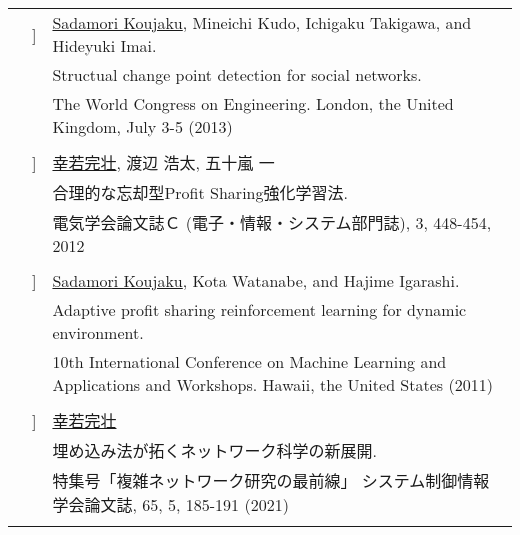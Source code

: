 \documentclass[letterpaper, 11pt]{article}
\newcounter{papercount}
\newcounter{papertype}
\newcommand{\changepapertype}{\setcounter{papercount}{0}\stepcounter{papertype}}
\newcommand{\paperitem}{%
\stepcounter{papercount}%
{\color{OliveGreen}{[\Alph{papertype}\thepapercount}]}
}
\begin{document}
\begin{longtable}{p{1.3in}p{2em}p{5.5in}}
                                                    &\paperitem &  \underline{Sadamori Koujaku}, Mineichi Kudo, Ichigaku Takigawa, and Hideyuki Imai. \\
                                                    & & Structual change point detection for social networks. \\
                                                    & & The World Congress on Engineering. London, the United Kingdom, July 3-5 (2013)\\
                                                    & \\

                                                    &\paperitem & \underline{幸若完壮}, 渡辺 浩太, 五十嵐 一 \\
                                                    & & 合理的な忘却型Profit Sharing強化学習法. \\
                                                    & & 電気学会論文誌Ｃ (電子・情報・システム部門誌), 3, 448-454, 2012\\
                                                    & \\

                                                    &\paperitem & \underline{Sadamori Koujaku}, Kota Watanabe, and Hajime Igarashi. \\
                                                    & & Adaptive profit sharing reinforcement learning for dynamic environment. \\
                                                    & & 10th International Conference on Machine Learning and Applications and Workshops. Hawaii, the United States (2011)\\
                                                    & \\
    \changepapertype
    \nohyphens{\color{OliveGreen}{COMMENTARY}}
                                                    &\paperitem & \underline{幸若完壮}\\
                                                    & & 埋め込み法が拓くネットワーク科学の新展開. \\
                                                    & & 特集号「複雑ネットワーク研究の最前線」 システム制御情報学会論文誌, 65, 5, 185-191 (2021) \\
                                                    & \\



\end{longtable}
\end{document}
